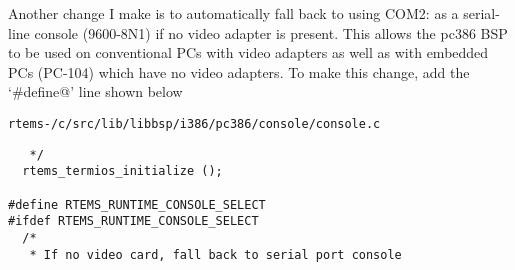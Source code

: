 \documentclass{report}
\begin{document}
Another change I make is to automatically fall back to using COM2: as a
serial-line console (9600-8N1) if no video adapter is present.  This allows
the pc386 BSP to be used on conventional PCs with video adapters as well
as with embedded PCs (PC-104) which have no video adapters.
To make this change, add the `\verb@#define@' line shown below
\begin{alltt}
rtems-\rtemsVersion/c/src/lib/libbsp/i386/pc386/console/console.c
\end{alltt}
\begin{verbatim}
   */
  rtems_termios_initialize ();

#define RTEMS_RUNTIME_CONSOLE_SELECT
#ifdef RTEMS_RUNTIME_CONSOLE_SELECT
  /*
   * If no video card, fall back to serial port console
\end{verbatim}
\end{document}
